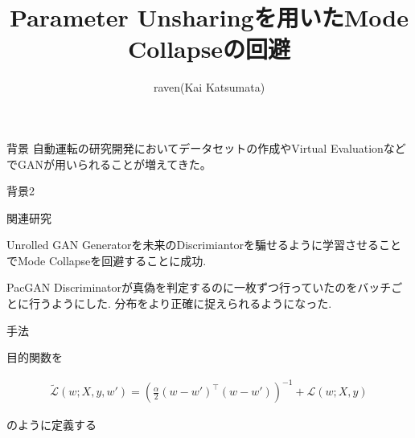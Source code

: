 \documentclass[dvipdfmx,12pt,unicode]{beamer}
\title{Parameter Unsharingを用いたMode Collapseの回避}
\author{raven(Kai Katsumata)}
\institute[JPN]{SL B2 \\ 親 ryoga}
\begin{document}
\begin{frame}\frametitle{}
  \maketitle
\end{frame}

\begin{frame}{背景}
  自動運転の研究開発においてデータセットの作成やVirtual EvaluationなどでGANが用いられることが増えてきた。
\end{frame}

\begin{frame}{背景2}
\end{frame}

\begin{frame}{関連研究}

  \begin{block}{Unrolled GAN\cite{unrolled}}
    Generatorを未来のDiscrimiantorを騙せるように学習させることでMode Collapseを回避することに成功.
  \end{block}

  \begin{block}{PacGAN\cite{pacgan}}
    Discriminatorが真偽を判定するのに一枚ずつ行っていたのをバッチごとに行うようにした. 分布をより正確に捉えられるようになった.
  \end{block}
\end{frame}


\begin{frame}{手法}

目的関数を

\begin{eqnarray}
  \label{unshare}
  \tilde{\mathcal{L}}(w; X, y, w') =  (\frac{\alpha}{2} (w - w')^{\top}(w - w'))^{-1} + \mathcal{L}(w; X, y)  
\end{eqnarray}


のように定義する
  
\end{frame}
\end{document}
